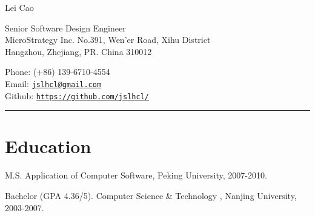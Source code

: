 \documentclass[letterpaper]{article}
\def\name{Lei Cao}
\renewenvironment{itemize}{
  \begin{list}{}{
    \setlength{\leftmargin}{1.5em}
    \setlength{\itemsep}{0pt}
  }
}{
  \end{list}
}
\begin{document}
{\huge \name}


\vspace{0.2in}
\begin{minipage}{0.55\linewidth}
  Senior Software Design Engineer \\
  MicroStrategy Inc.
  No.391, Wen'er Road, Xihu District\\
  Hangzhou, Zhejiang, PR. China 310012
\end{minipage}
\vspace{0.2in}
\begin{minipage}{0.40\linewidth}
  Phone: ($+$86) 139-6710-4554 \\
  Email: \href{mailto:jslhcl@gmail.com}{\tt jslhcl@gmail.com} \\
  Github: \href{https://github.com/jslhcl/}{\tt https://github.com/jslhcl/} 
\end{minipage}

\rule{16.8cm}{0.1em}


\vspace{-1.5em}
\section*{Education}
\begin{itemize}
  \item M.S. Application of Computer Software, Peking University, 2007-2010.
  \item Bachelor (GPA 4.36/5). Computer Science \& Technology , Nanjing University, 2003-2007.
\end{itemize}

\end{document}
